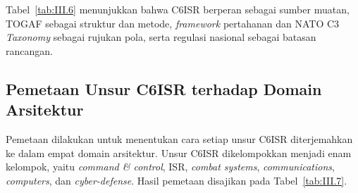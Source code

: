 Tabel~\ref{tab:III.6} menunjukkan bahwa C6ISR berperan sebagai sumber muatan, TOGAF sebagai struktur dan metode, \textit{framework} pertahanan dan NATO C3 \textit{Taxonomy} sebagai rujukan pola, serta regulasi nasional sebagai batasan rancangan.

\subsection{Pemetaan Unsur C6ISR terhadap Domain Arsitektur}
\label{sec:III.2.3}

Pemetaan dilakukan untuk menentukan cara setiap unsur C6ISR diterjemahkan ke dalam empat domain arsitektur. Unsur C6ISR dikelompokkan menjadi enam kelompok, yaitu \textit{command \& control}, ISR, \textit{combat systems}, \textit{communications}, \textit{computers}, dan \textit{cyber-defense}. Hasil pemetaan disajikan pada Tabel~\ref{tab:III.7}.

